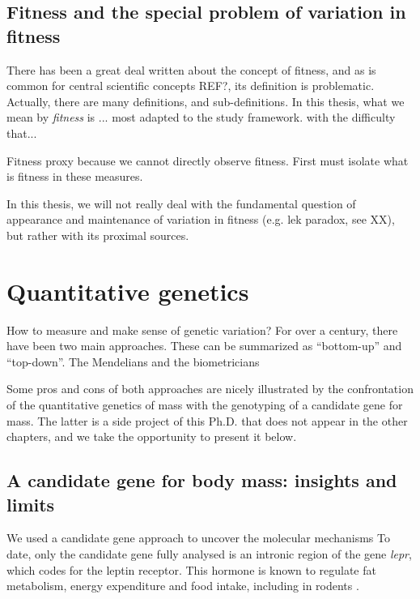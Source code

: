 \subsection{Fitness and the special problem of variation in fitness}
There has been a great deal written about the concept of fitness, and as is common for central scientific concepts REF?, its definition is problematic. Actually, there are many definitions, and sub-definitions. 
In this thesis, what we mean by \emph{fitness} is ...
most adapted to the study framework.
with the difficulty that... 

Fitness proxy because we cannot directly observe fitness. First must isolate what is fitness in these measures. 


In this thesis, we will not really deal with the fundamental question of appearance and maintenance of variation in fitness (e.g. lek paradox, see XX), but rather with its proximal sources.

 
\section{Quantitative genetics}

How to measure and make sense of genetic variation?
For over a century, there have been two main approaches. 
These can be summarized as ``bottom-up'' and ``top-down''.
The Mendelians and the biometricians

Some pros and cons of both approaches are nicely illustrated by the confrontation of the quantitative genetics of mass with the genotyping of a candidate gene for mass. The latter is a side project of this Ph.D. that does not appear in the other chapters, and we take the opportunity to present it below.

\subsection{A candidate gene for body mass: insights and limits}

We used a candidate gene approach to uncover the molecular mechanisms 
To date, only the candidate gene fully analysed is an intronic region of the gene \emph{lepr}, which codes for the leptin receptor. This hormone is known to regulate fat metabolism, energy expenditure and food intake, including in rodents \parencite{Houseknecht1998}.

